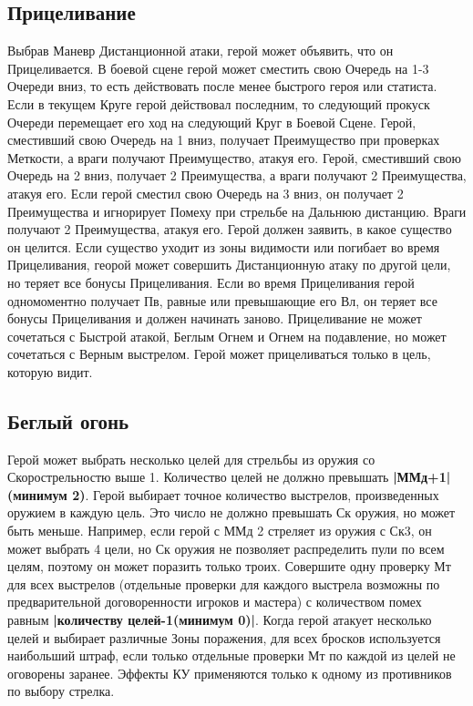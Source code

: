 \subsection{Прицеливание}
Выбрав Маневр Дистанционной атаки, герой может объявить, что он Прицеливается. В боевой сцене герой может сместить свою Очередь на 1-3 Очереди вниз, то есть действовать после менее быстрого героя или статиста. Если в текущем Круге герой действовал последним, то следующий прокуск Очереди перемещает его ход на следующий Круг в Боевой Сцене. Герой, сместивший свою Очередь на 1 вниз, получает Преимущество при проверках Меткости, а враги получают Преимущество, атакуя его. Герой, сместивший свою Очередь на 2 вниз, получает 2 Преимущества, а враги получают 2 Преимущества, атакуя его. Если герой сместил свою Очередь на 3 вниз, он получает 2 Преимущества и игнорирует Помеху при стрельбе на Дальнюю дистанцию. Враги получают 2 Преимущества, атакуя его.
\newline
Герой должен заявить, в какое существо он целится. Если существо уходит из зоны видимости или погибает во время Прицеливания, георой может совершить Дистанционную атаку по другой цели, но теряет все бонусы Прицеливания.
\newline
Если во время Прицеливания герой одномоментно получает Пв, равные или превышающие его Вл, он теряет все бонусы Прицеливания и должен начинать заново. Прицеливание не может сочетаться с Быстрой атакой, Беглым Огнем и Огнем на подавление, но может сочетаться с Верным выстрелом. Герой может прицеливаться только в цель, которую видит.
\subsection{Беглый огонь}
Герой может выбрать несколько целей для стрельбы из оружия со Скорострельностю выше 1. Количество целей не должно превышать \textbf{|ММд+1|(минимум 2)}. Герой выбирает точное количество выстрелов, произведенных оружием в каждую цель. Это число не должно превышать Ск оружия, но может быть меньше. Например, если герой с ММд 2 стреляет из оружия с Ск3, он может выбрать 4 цели, но Ск оружия не позволяет распределить пули по всем целям, поэтому он может поразить только троих.
\newline
Совершите одну проверку Мт для всех выстрелов (отдельные проверки для каждого выстрела возможны по предварительной договоренности игроков и мастера) с количеством помех равным \textbf{|количеству целей-1(минимум 0)|}. Когда герой атакует несколько целей и выбирает различные Зоны поражения, для всех бросков используется наибольший штраф, если только отдельные проверки Мт по каждой из целей не оговорены заранее.
\newline
Эффекты КУ применяются только к одному из противников по выбору стрелка.
